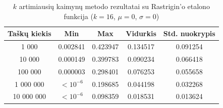 \begin{table}[H]
    \centering
    \begin{tabular}{|c|c|c|c|c|}
        \hline
        \textbf{Taškų kiekis} & \textbf{Min} & \textbf{Max} & \textbf{Vidurkis} & \textbf{Std. nuokrypis} \\ \hline
        1 000        & 0.002841 & 0.423947 & 0.134517 & 0.091254 \\ \hline
        10 000       & 0.000149 & 0.399783 & 0.090234 & 0.066418 \\ \hline
        100 000      & 0.000003 & 0.298401 & 0.076253 & 0.055658 \\ \hline
        1 000 000    & $<10^{-6}$ & 0.198685 & 0.044198 & 0.032268 \\ \hline
        10 000 000   & $<10^{-6}$ & 0.098359 & 0.018531 & 0.013624 \\ \hline
    \end{tabular}
    \caption{$k$ artimiausių kaimynų metodo rezultatai su Rastrigin'o etalono funkcija ($k = 16$, $\mu = 0$, $\sigma = 0$)}
\end{table}